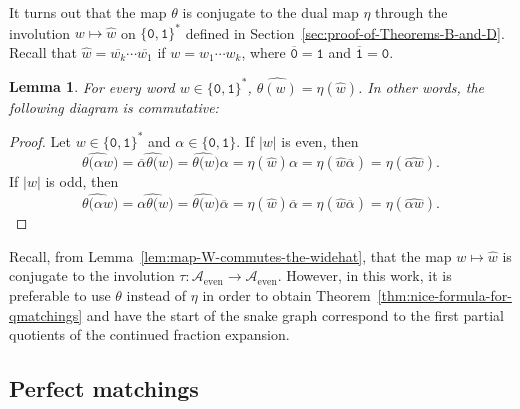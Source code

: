 \documentclass[a4paper,12pt]{amsart}
\newtheorem{lemma}[definition]{Lemma}
\newcommand{\Acal}{{\mathcal{A}}}
\newcommand{\0}{\mathtt{0}}
\newcommand{\1}{\mathtt{1}}
\newcommand{\2}{\mathtt{2}}
\newcommand{\3}{\mathtt{3}}
\newcommand{\Acaleven}{{\Acal_{\text{even}}}}
\begin{document}
It turns out that the map $\theta$ is conjugate to the dual map $\eta$ through the involution
$w \mapsto \widehat{w}$ on $\{\0,\1\}^*$ defined in
Section~\ref{sec:proof-of-Theorems-B-and-D}.
Recall that $\widehat{w} = \overline{w_k} \cdots \overline{w_1}$ if $w = w_1
\cdots w_k$, where $\overline{\0}=\1$ and $\overline{\1}=\0$.

\begin{lemma}\label{lem:the-dual-map-eta}
    For every word $w\in\{\0,\1\}^*$,
    $\widehat{\theta(w)}=\eta(\widehat{w})$.
    In other words, the following diagram is commutative:
\begin{center}
\end{center}
\end{lemma}

%
%
%
%
%
%
%
%
%

\begin{proof}
    Let $w\in\{\0,\1\}^*$ and $\alpha\in\{\0,\1\}$.
    If $|w|$ is even, then
    \[
      \widehat{\theta(\alpha w})
     =\widehat{\overline{\alpha}\theta(w})
     =\widehat{\theta(w})\alpha
     =\eta(\widehat{w})\alpha
     =\eta(\widehat{w}\overline{\alpha})
     =\eta(\widehat{\alpha w}).
    \]
    If $|w|$ is odd, then
    \[
      \widehat{\theta(\alpha w})
     =\widehat{\alpha\theta(w})
     =\widehat{\theta(w})\overline{\alpha}
     =\eta(\widehat{w})\overline{\alpha}
     =\eta(\widehat{w}\overline{\alpha})
     =\eta(\widehat{\alpha w}).
    \]
\end{proof}

Recall, from Lemma~\ref{lem:map-W-commutes-the-widehat}, that the map $w
\mapsto \widehat{w}$ is conjugate to the involution
$\tau:\Acaleven\to\Acaleven$.
However, in this work, it is preferable to use $\theta$ instead of $\eta$ in
order to
obtain Theorem~\ref{thm:nice-formula-for-qmatchings}
and
have the start of the snake graph correspond to the first partial
quotients of the continued fraction expansion.

\subsection{Perfect matchings}
\end{document}
